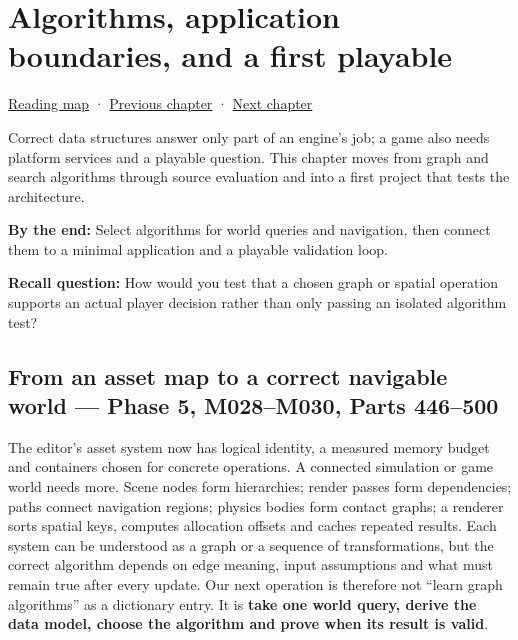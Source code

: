 \chapter{Algorithms, application boundaries, and a first playable}\label{05-engine-i-ch008-algorithms-application-boundaries-and-a-first-playable}\hypertarget{05-engine-i-ch008}{}\label{stagechapter:05-engine-i-ch008}

\hypertarget{05-engine-i-ch008-algorithms-application-boundaries-and-a-first-playable}{}

\hyperref[volume-reading-map]{Reading map} · \hyperref[04-visual-computing-ii-ch043]{Previous chapter} · \hyperref[05-engine-i-ch009-player-choices-rules-and-readable-feedback]{Next chapter}

Correct data structures answer only part of an engine's job; a game also needs platform services and a playable question. This chapter moves from graph and search algorithms through source evaluation and into a first project that tests the architecture.

\textbf{By the end:} Select algorithms for world queries and navigation, then connect them to a minimal application and a playable validation loop.

\textbf{Recall question:} How would you test that a chosen graph or spatial operation supports an actual player decision rather than only passing an isolated algorithm test?

\section{From an asset map to a correct navigable world --- Phase 5, M028--M030, Parts 446--500}\label{05-engine-i-ch008-from-an-asset-map-to-a-correct-navigable-world-phase-5-m028m030-parts-446500}

\hypertarget{05-engine-i-ch008-from-an-asset-map-to-a-correct-navigable-world-phase-5-m028m030-parts-446500}{}

The editor's asset system now has logical identity, a measured memory budget and containers chosen for concrete operations. A connected simulation or game world needs more. Scene nodes form hierarchies; render passes form dependencies; paths connect navigation regions; physics bodies form contact graphs; a renderer sorts spatial keys, computes allocation offsets and caches repeated results. Each system can be understood as a graph or a sequence of transformations, but the correct algorithm depends on edge meaning, input assumptions and what must remain true after every update. Our next operation is therefore not ``learn graph algorithms'' as a dictionary entry. It is \textbf{take one world query, derive the data model, choose the algorithm and prove when its result is valid}.

